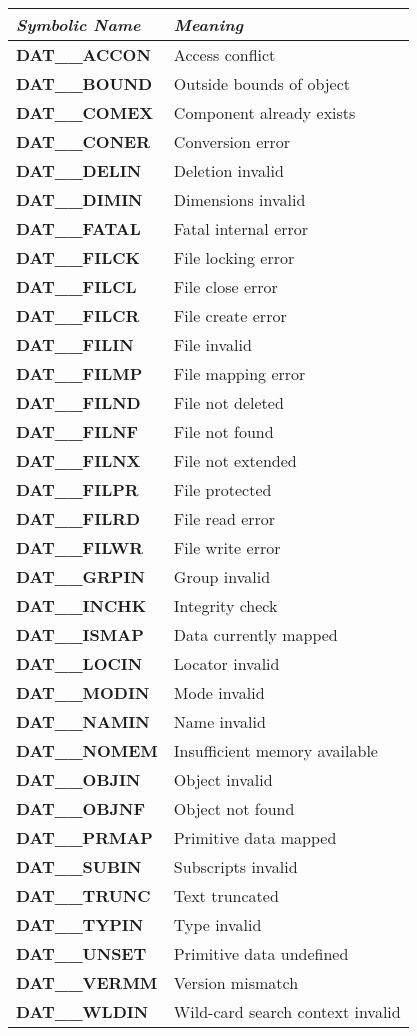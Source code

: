 \documentclass[twoside,11pt]{starlink}
\providecommand{\st}[1]{{\emph{#1}}}
\begin{document}
\small
\begin{center}
\begin{tabular}{|l|l|} \hline
\st{Symbolic Name} & \st{Meaning}\\ \hline \hline
\textbf{DAT\_\_ACCON} & Access conflict\\
\textbf{DAT\_\_BOUND} & Outside bounds of object\\
\textbf{DAT\_\_COMEX} & Component already exists\\
\textbf{DAT\_\_CONER} & Conversion error\\
\textbf{DAT\_\_DELIN} & Deletion invalid\\
\textbf{DAT\_\_DIMIN} & Dimensions invalid\\
\textbf{DAT\_\_FATAL} & Fatal internal error\\
\textbf{DAT\_\_FILCK} & File locking error\\
\textbf{DAT\_\_FILCL} & File close error\\
\textbf{DAT\_\_FILCR} & File create error\\
\textbf{DAT\_\_FILIN} & File invalid\\
\textbf{DAT\_\_FILMP} & File mapping error\\
\textbf{DAT\_\_FILND} & File not deleted\\
\textbf{DAT\_\_FILNF} & File not found\\
\textbf{DAT\_\_FILNX} & File not extended\\
\textbf{DAT\_\_FILPR} & File protected\\
\textbf{DAT\_\_FILRD} & File read error\\
\textbf{DAT\_\_FILWR} & File write error\\
\textbf{DAT\_\_GRPIN} & Group invalid\\
\textbf{DAT\_\_INCHK} & Integrity check\\
\textbf{DAT\_\_ISMAP} & Data currently mapped\\
\textbf{DAT\_\_LOCIN} & Locator invalid\\
\textbf{DAT\_\_MODIN} & Mode invalid\\
\textbf{DAT\_\_NAMIN} & Name invalid\\
\textbf{DAT\_\_NOMEM} & Insufficient memory available\\
\textbf{DAT\_\_OBJIN} & Object invalid\\
\textbf{DAT\_\_OBJNF} & Object not found\\
\textbf{DAT\_\_PRMAP} & Primitive data mapped\\
\textbf{DAT\_\_SUBIN} & Subscripts invalid\\
\textbf{DAT\_\_TRUNC} & Text truncated\\
\textbf{DAT\_\_TYPIN} & Type invalid\\
\textbf{DAT\_\_UNSET} & Primitive data undefined\\
\textbf{DAT\_\_VERMM} & Version mismatch\\
\textbf{DAT\_\_WLDIN} & Wild-card search context invalid \\
\hline
\end{tabular}
\end{center}
\end{document}
